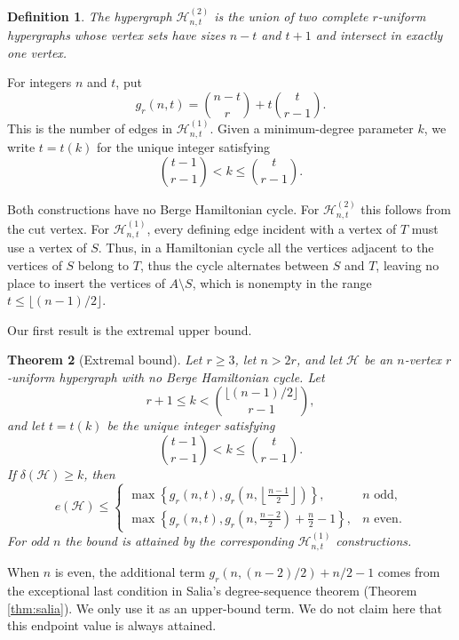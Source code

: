 \documentclass[12pt]{article}
\newtheorem{theorem}{Theorem}[section]
\newtheorem{definition}[theorem]{Definition}
\newcommand{\Hcal}{\mathcal H}
\begin{document}
\begin{definition}
The hypergraph $\Hcal^{(2)}_{n,t}$ is the union of two complete
$r$-uniform hypergraphs whose vertex sets have sizes $n-t$ and $t+1$ and
intersect in exactly one vertex.
\end{definition}
For integers $n$ and $t$, put
\begin{equation}\label{eq:def-gr}
        g_r(n,t)=\binom{n-t}{r}+t\binom{t}{r-1}.
\end{equation}
This is the number of edges in $\Hcal^{(1)}_{n,t}$.  Given a
minimum-degree parameter $k$, we write $t=t(k)$ for the unique integer
satisfying
$$
        \binom{t-1}{r-1}<k\le \binom{t}{r-1}.
$$

Both constructions have no Berge Hamiltonian cycle.  For
$\Hcal^{(2)}_{n,t}$ this follows from the cut vertex.  For
$\Hcal^{(1)}_{n,t}$, every defining edge incident with a vertex of $T$
must use a vertex of $S$.  Thus, in a Hamiltonian cycle
all the vertices adjacent to the vertices of $S$ belong to $T$, thus the cycle alternates between $S$ and $T$,
leaving no
place to insert the vertices of $A\setminus S$, which is nonempty in the
range $t\le \lfloor (n-1)/2\rfloor$.

Our first result is the extremal upper bound.

\begin{theorem}[Extremal bound]\label{thm:extremal}
Let $r\ge 3$, let $n>2r$, and let $\Hcal$ be an $n$-vertex
$r$-uniform hypergraph with no Berge Hamiltonian cycle.  Let
$$
        r+1\le k< \binom{\lfloor (n-1)/2\rfloor}{r-1},
$$
and let $t=t(k)$ be the unique integer satisfying
$$
        \binom{t-1}{r-1}< k\le \binom{t}{r-1}.
$$
If $\delta(\Hcal)\ge k$, then
$$
e(\Hcal)\le
\begin{cases}
\max\left\{g_r(n,t),g_r\left(n,\left\lfloor\frac{n-1}{2}\right\rfloor\right)\right\},
& n\text{ odd},\\[4pt]
\max\left\{g_r(n,t),g_r\left(n,\frac{n-2}{2}\right)+\frac n2-1\right\},
& n\text{ even}.
\end{cases}
$$
For odd $n$ the bound is attained by the corresponding
$\Hcal^{(1)}_{n,t}$ constructions.
\end{theorem}

When $n$ is even, the additional term
$g_r(n,(n-2)/2)+n/2-1$ comes from the exceptional last condition in
Salia's degree-sequence theorem (Theorem \ref{thm:salia}).  We only use it as an upper-bound term.
We do not claim here that this endpoint value is always attained.
\end{document}
